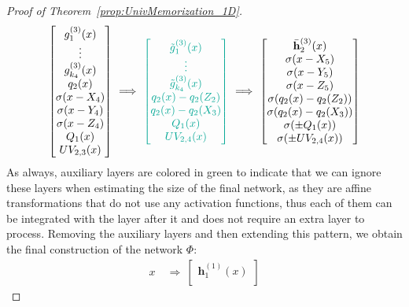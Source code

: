 \documentclass{article}
\numberwithin{equation}{section}
\theoremstyle{definition}
\begin{document}
\begin{proof}[{Proof of Theorem~\ref{prop:UnivMemorization_1D}}]
\begin{align}
{\begin{bmatrix}
        g_1^{(3)} (x)  \\  
        \vdots  \\  
        g_{k_4}^{(3)} (x)  \\
        q_2(x)  \\  
        \sigma(x - X_{4})  \\  
        \sigma(x - Y_{4})  \\
        \sigma(x - Z_{4})  \\
        Q_1(x)  \\
        UV_{2,3}(x)
    \end{bmatrix}
    }
    \ \Longrightarrow \ 
    {\color{persiangreen}
    \begin{bmatrix}
        \tilde{g}_1^{(3)} (x)  \\  
        \vdots  \\  
        \tilde{g}_{k_4}^{(3)} (x)  \\
        q_2(x) - q_2(Z_2)  \\
        q_2(x) - q_2(X_3)  \\
        Q_1(x)  \\
        UV_{2,4}(x)
    \end{bmatrix}
    }
    \ \Longrightarrow \
    \begin{bmatrix}
        \Bar{\mathbf{h}}_2^{(3)} (x)  \\
        \sigma(x - X_{5})  \\  
        \sigma(x - Y_{5})  \\
        \sigma(x - Z_{5})  \\
        \sigma( q_2(x) - q_2(Z_2) )  \\
        \sigma( q_2(x) - q_2(X_3) )  \\
        \sigma( \pm Q_1(x) )  \\ 
        \sigma( \pm UV_{2,4}(x) ) 
    \end{bmatrix}
\end{align}
As always, auxiliary layers are colored in green to indicate that we can ignore these layers when estimating the size of the final network, as they are affine transformations that do not use any activation functions, thus each of them can be integrated with the layer after it and does not require an extra layer to process. Removing the auxiliary layers and then extending this pattern, we obtain the final construction of the network $\Phi$: 
\begin{align*}
    x 
    \ &\Longrightarrow \ 
    \begin{bmatrix}
        \mathbf{h}_1^{(1)} (x)  \\  

\end{bmatrix}
\end{align*}
\end{proof}
\end{document}
